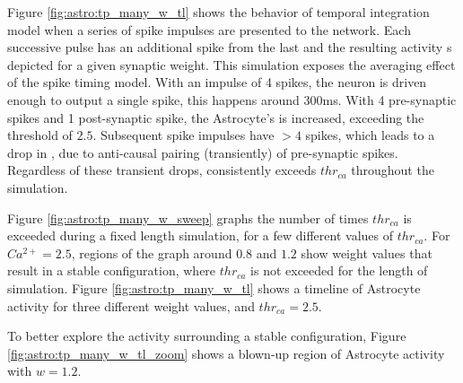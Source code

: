 Figure \ref{fig:astro:tp_many_w_tl} shows the behavior of temporal
integration model when a series of spike impulses are presented to the
network. Each successive pulse has an additional spike from the last and the
resulting \ca activity s depicted for a given synaptic weight. This simulation
exposes the averaging effect of the spike timing model. With an impulse of 4
spikes, the neuron is driven enough to output a single spike, this happens around
300ms. With 4 pre-synaptic spikes and 1 post-synaptic spike, the Astrocyte's
\ca is increased, exceeding the threshold of $2.5$. Subsequent spike impulses
have $>4$ spikes, which leads to a drop in \ca, due to anti-causal pairing
(transiently) of pre-synaptic spikes. Regardless of these transient drops, \ca
consistently exceeds $thr_{ca}$ throughout the simulation.


Figure \ref{fig:astro:tp_many_w_sweep} graphs the number of times $thr_{ca}$ is
exceeded during a fixed length simulation, for a few different values of
$thr_{ca}$. For $Ca^{2+}=2.5$, regions of the graph around $0.8$ and $1.2$ show
weight values that result in a stable configuration, where $thr_{ca}$ is not
exceeded for the length of simulation. Figure \ref{fig:astro:tp_many_w_tl} shows
a timeline of Astrocyte activity for three different weight values, and
$thr_{ca}=2.5$.



To better explore the activity surrounding a stable configuration, Figure
\ref{fig:astro:tp_many_w_tl_zoom} shows a blown-up region of Astrocyte activity
with $w=1.2$.

